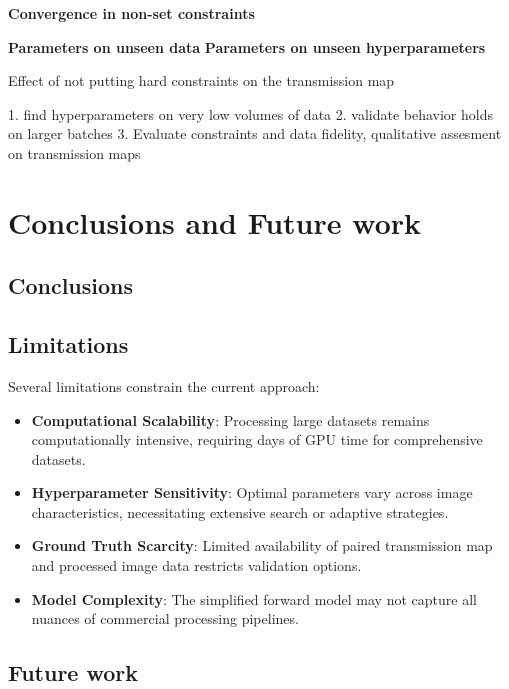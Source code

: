 \documentclass[nomenclature, english, bibtex]{kththesis}
\numberwithin{listing}{chapter}
\begin{document}
\textbf{Convergence in non-set constraints}

\textbf{Parameters on unseen data}
\textbf{Parameters on unseen hyperparameters}


Effect of not putting hard constraints on the transmission map



1. find hyperparameters on very low volumes of data
2. validate behavior holds on larger batches
3. Evaluate constraints and data fidelity, qualitative assesment on transmission maps



\cleardoublepage
\chapter{Conclusions and Future work}
\label{ch:conclusionsAndFutureWork}

\section{Conclusions}
\label{sec:conclusions}


\section{Limitations}
\label{sec:limitations}

Several limitations constrain the current approach:

\begin{itemize}
    \item \textbf{Computational Scalability}: Processing large datasets remains computationally intensive, requiring days of GPU time for comprehensive datasets.

    \item \textbf{Hyperparameter Sensitivity}: Optimal parameters vary across image characteristics, necessitating extensive search or adaptive strategies.

    \item \textbf{Ground Truth Scarcity}: Limited availability of paired transmission map and processed image data restricts validation options.

    \item \textbf{Model Complexity}: The simplified forward model may not capture all nuances of commercial processing pipelines.
\end{itemize}

\section{Future work}
\label{sec:futureWork}
\end{document}
